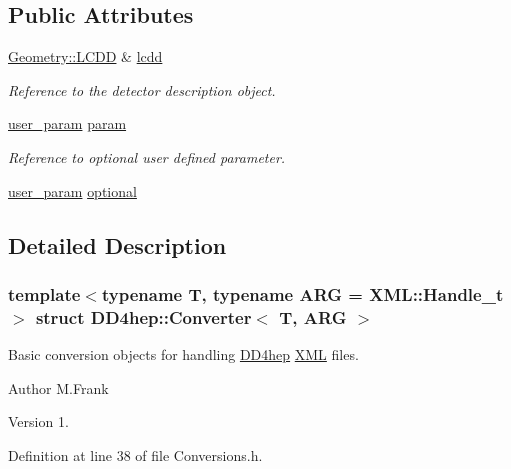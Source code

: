 \subsection*{Public Attributes}
\begin{DoxyCompactItemize}
\item 
\hyperlink{class_d_d4hep_1_1_geometry_1_1_l_c_d_d}{Geometry\+::\+L\+C\+DD} \& \hyperlink{struct_d_d4hep_1_1_converter_acefaa7bdcbf210e64d96db04f90b5c9c}{lcdd}
\begin{DoxyCompactList}\small\item\em Reference to the detector description object. \end{DoxyCompactList}\item 
\hyperlink{struct_d_d4hep_1_1_converter_a13a876ea9cfcadf85a3dadd32e97a834}{user\+\_\+param} \hyperlink{struct_d_d4hep_1_1_converter_ac6d7d17feb235d19267a40c8e6dfb2ca}{param}
\begin{DoxyCompactList}\small\item\em Reference to optional user defined parameter. \end{DoxyCompactList}\item 
\hyperlink{struct_d_d4hep_1_1_converter_a13a876ea9cfcadf85a3dadd32e97a834}{user\+\_\+param} \hyperlink{struct_d_d4hep_1_1_converter_a884a538646c4dd3043e3d6234db2cc0d}{optional}
\end{DoxyCompactItemize}


\subsection{Detailed Description}
\subsubsection*{template$<$typename T, typename A\+RG = X\+M\+L\+::\+Handle\+\_\+t$>$\newline
struct D\+D4hep\+::\+Converter$<$ T, A\+R\+G $>$}

Basic conversion objects for handling \hyperlink{namespace_d_d4hep}{D\+D4hep} \hyperlink{namespace_d_d4hep_1_1_x_m_l}{X\+ML} files. 

\begin{DoxyAuthor}{Author}
M.\+Frank 
\end{DoxyAuthor}
\begin{DoxyVersion}{Version}
1. 
\end{DoxyVersion}


Definition at line 38 of file Conversions.\+h.



